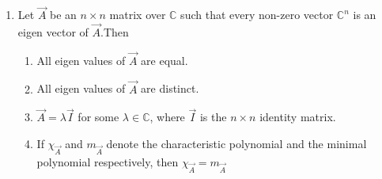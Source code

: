 \renewcommand{\theequation}{\theenumi}
\renewcommand{\thefigure}{\theenumi}
\begin{enumerate}[label=\thesection.\arabic*.,ref=\thesection.\theenumi]

\item Let $\vec{A}$ be an $n\times n$ matrix over $\mathbb{C}$ such that every non-zero vector $\mathbb{C}^n$ is an eigen vector of $\vec{A}$.Then
\begin{enumerate}
    \item All eigen values of $\vec{A}$ are equal.
    \item All eigen values of $\vec{A}$ are distinct.
    \item $\vec{A}=\lambda\vec{I}$ for some $\lambda \in \mathbb{C}$, where $\vec{I}$ is the $n\times n$ identity matrix.
    \item If $\chi_\vec{A}$ and $m_\vec{A}$ denote the characteristic polynomial and the minimal polynomial respectively, then $\chi_\vec{A}=m_\vec{A}$
\end{enumerate}
%

\solution


\end{enumerate}
